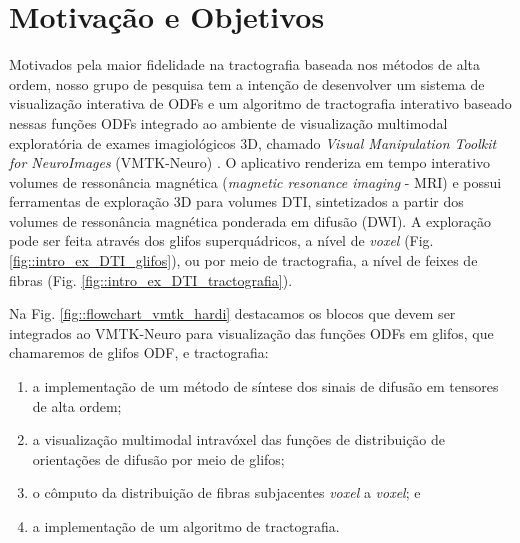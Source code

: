 \documentclass[
    12pt,                %
    oneside,            %
    a4paper,            %
    english,            %
    french,                %
    spanish,            %
    brazil                %
    ]{abntex2}
\begin{document}




\section{Motivação e Objetivos}
\label{ssec:motivation}

Motivados pela maior fidelidade na tractografia baseada nos métodos de alta ordem, nosso grupo de pesquisa tem a intenção de desenvolver um sistema de visualização interativa de ODFs e um algoritmo de tractografia interativo baseado nessas funções ODFs integrado ao ambiente de visualização multimodal  exploratória de exames imagiológicos 3D, chamado \textit{ Visual Manipulation Toolkit for NeuroImages} (VMTK-Neuro) \cite{VMTKNeuro}.  O aplicativo renderiza em tempo interativo volumes de ressonância magnética (\textit{magnetic resonance imaging} - MRI) e possui ferramentas de exploração 3D para volumes DTI, sintetizados a partir dos volumes de ressonância magnética ponderada em difusão (DWI). A exploração pode ser feita através dos glifos superquádricos, a nível de \textit{voxel} (Fig. \ref{fig::intro_ex_DTI_glifos}), ou por meio de tractografia, a nível de feixes de fibras (Fig. \ref{fig::intro_ex_DTI_tractografia}).

Na Fig. \ref{fig::flowchart_vmtk_hardi} destacamos os blocos que devem ser integrados ao VMTK-Neuro para visualização das funções ODFs em glifos, que chamaremos de glifos ODF, e tractografia: 

\begin{enumerate}
    \item a implementação de um método de síntese dos sinais de difusão em tensores de alta ordem;
    \item a visualização multimodal intravóxel das funções de distribuição de orientações de difusão por meio de glifos;
    \item o cômputo da distribuição de fibras subjacentes \textit{voxel} a \textit{voxel}; e
    \item a implementação de um algoritmo de tractografia.
\end{enumerate}
\end{document}
